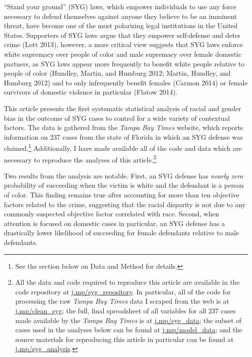 \documentclass[12pt,article]{article}
\begin{document}
``Stand your ground'' (SYG) laws, which empower individuals to use any
force necessary to defend themselves against anyone they believe to be
an imminent threat, have become one of the most polarizing legal
institutions in the United States. Supporters of SYG laws argue that
they empower self-defense and deter crime (Lott 2013), however, a more
critical view suggests that SYG laws enforce white supremacy over people
of color and male supremacy over female domestic partners, as SYG laws
appear more frequently to benefit white people relative to people of
color (Hundley, Martin, and Humburg 2012; Martin, Hundley, and Humburg
2012) and to only infrequently benefit females (Carmon 2014) or female
survivors of domestic violence in particular (Flatow 2014).

This article presents the first systematic statistical analysis of
racial and gender bias in the outcome of SYG cases to control for a wide
variety of contextual factors. The data is gathered from the \emph{Tampa
Bay Times} website, which reports information on 237 cases from the
state of Florida in which an SYG defense was claimed.\footnote{See the
  section below on Data and Method for details.} Additionally, I have
made available all of the code and data which are necessary to reproduce
the analyses of this article.\footnote{All the data and code required to
  reproduce this article are available in the code repository at
  \href{http://j.mp/syg_repository}{j.mp/syg\_repository}. In
  particular, all of the code for processing the raw \emph{Tampa Bay
  Times} data I scraped from the web is at
  \href{http://j.mp/clean_syg}{j.mp/clean\_syg}; the full, final
  spreadsheet of all variables for all 237 cases made available by the
  \emph{Tampa Bay Times} is at
  \href{http://j.mp/syg_data}{j.mp/syg\_data}; the subset of cases used
  in the analyses below can be found at
  \href{http://j.mp/model_data}{j.mp/model\_data}; and the source
  materials for reproducing this article in particular can be found at
  \href{http://j.mp/syg_analysis}{j.mp/syg\_analysis}.}

Two results from the analysis are notable. First, an SYG defense has
\emph{nearly zero} probability of succeeding when the victim is white
and the defendant is a person of color. This finding remains true after
accounting for more than ten objective factors related to the crime,
suggesting that the racial disparity is not due to any commonly
suspected objective factor correlated with race. Second, when attention
is focused on domestic cases in particular, an SYG defense has a
drastically lower likelihood of succeeding for female defendants
relative to male defendants.
\end{document}
